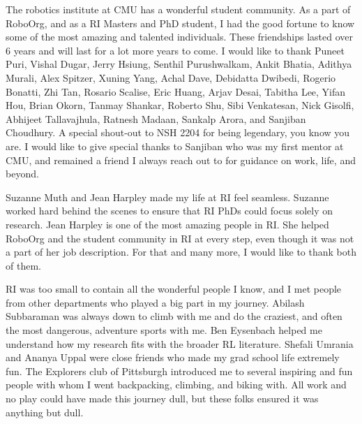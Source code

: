 \documentclass[11pt]{cmuthesis}
\begin{document}
\begin{acknowledgments}

  The robotics institute at CMU has a wonderful student community. As
  a part of RoboOrg, and as a RI Masters and PhD student, I had the good
  fortune to know some of the most amazing and talented
  individuals. These friendships lasted over 6 years and will last for
  a lot more years to come. I would like to thank
  Puneet Puri, Vishal Dugar, Jerry Hsiung, Senthil Purushwalkam, Ankit Bhatia,
  Adithya Murali, Alex Spitzer, Xuning Yang, Achal Dave, Debidatta
  Dwibedi, Rogerio
  Bonatti, Zhi Tan, Rosario Scalise, Eric Huang, Arjav Desai, Tabitha Lee,
  Yifan Hou, Brian Okorn, Tanmay Shankar, Roberto Shu, Sibi
  Venkatesan, Nick
  Gisolfi, Abhijeet Tallavajhula, Ratnesh Madaan, Sankalp Arora, and
  Sanjiban Choudhury. A special shout-out to NSH 2204 for being
  legendary, you know you are. I would like to give special thanks to
  Sanjiban who was my first mentor at CMU, and remained a friend
  I always reach out to for guidance on work, life, and beyond.

  Suzanne Muth and Jean Harpley made my life at RI feel seamless. Suzanne
  worked hard behind the scenes to ensure that RI PhDs could focus
  solely on research. Jean Harpley is one of the most amazing people
  in RI. She helped RoboOrg and the student community in RI at every
  step, even though it was not a part of her job description. For that
  and many more, I would like to thank both of them.

  RI was too small to contain all the wonderful people I know, and I
  met people from other departments who played a big part in my
  journey. Abilash Subbaraman was always down to climb with me and do
  the craziest, and often the most dangerous, adventure sports with
  me. Ben Eysenbach helped me understand how my research fits with the
  broader RL literature. Shefali Umrania and Ananya Uppal were close
  friends who made my grad school life extremely fun. The Explorers
  club of Pittsburgh introduced me to several inspiring and fun
  people with whom I went backpacking, climbing, and biking
  with. All work and no play could have made this journey dull, but
  these folks ensured it was anything but dull.


\end{acknowledgments}
\end{document}
